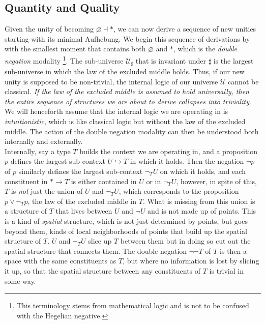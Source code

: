 \documentclass{article}
\begin{document}
\subsection{Quantity and Quality}
Given the unity of becoming $\varnothing\dashv *$, we can now derive a sequence of new unities starting
with its minimal Aufhebung. We begin this sequence of derivations by with the smallest moment that contains
both $\varnothing$ and $*$, which is the \emph{double negation} modality\cite{Sketches} \footnote{This
terminology stems from mathematical logic and is not to be confused with the Hegelian negative.}. The
sub-universe $\mathcal{U}_\sharp$ that is invariant under $\sharp$ is the largest sub-universe in which
the law of the excluded middle holds. Thus, if our new unity is supposed to be non-trivial, the internal
logic of our universe $\mathcal{U}$ cannot be classical. \emph{If the law of the excluded middle is assumed
to hold universally, then the entire sequence of structures we are about to derive collapses into triviality}.
We will henceforth assume that the internal logic we are operating in is \emph{intuitionistic}, which
is like classical logic but without the law of the excluded middle. The action of the double negation
modality can then be understood both internally and externally. \\

Internally, say a type $T$ builds the context we are operating in, and a proposition $p$ defines the largest
sub-context $U\hookrightarrow T$ in which it holds. Then the negation $\neg p$ of $p$ similarly defines
the largest sub-context $\neg_T U$ on which it holds, and each constituent in $*\rightarrow T$ is either
contained in $U$ or in $\neg_T U$, however, in spite of this, $T$ is \emph{not} just the union of $U$
and $\neg_T U$, which corresponds to the proposition $p\vee \neg_T p$, the law of the excluded middle
in $T$. What is missing from this union is a structure of $T$ that lives between $U$ and $\neg U$ and
is not made up of points. This is a kind of \emph{spatial} structure, which is not just determined by
points, but goes beyond them, kinds of local neighborhoods of points that build up the spatial structure
of $T$. $U$ and $\neg_T U$ slice up $T$ between them but in doing so cut out the spatial structure that
connects them. The double negation $\neg\neg T$ of $T$ is then a space with the same constituents as $T$,
but where no information is lost by slicing it up, so that the spatial structure between any constituents
of $T$ is trivial in some way. \\
\end{document}
